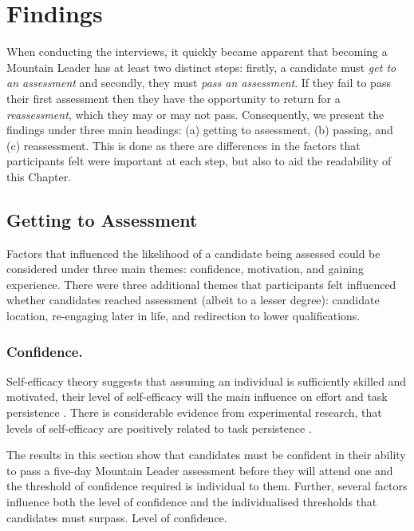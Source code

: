 \documentclass[
  12pt,
  a4paper,
]{book}
\begin{document}
\hypertarget{findings}{%
\section{Findings}\label{findings}}

When conducting the interviews, it quickly became apparent that becoming a Mountain Leader has at least two distinct steps: firstly, a candidate must \emph{get to an assessment} and secondly, they must \emph{pass an assessment}. If they fail to pass their first assessment then they have the opportunity to return for a \emph{reassessment}, which they may or may not pass. Consequently, we present the findings under three main headings: (a) getting to assessment, (b) passing, and (c) reassessment. This is done as there are differences in the factors that participants felt were important at each step, but also to aid the readability of this Chapter.

\hypertarget{qual-gta}{%
\subsection{Getting to Assessment}\label{qual-gta}}

Factors that influenced the likelihood of a candidate being assessed could be considered under three main themes: confidence, motivation, and gaining experience. There were three additional themes that participants felt influenced whether candidates reached assessment (albeit to a lesser degree): candidate location, re-engaging later in life, and redirection to lower qualifications.

\hypertarget{qual-gta-confidence}{%
\subsubsection{Confidence.}\label{qual-gta-confidence}}

Self-efficacy theory suggests that assuming an individual is sufficiently skilled and motivated, their level of self-efficacy will the main influence on effort and task persistence \citep{Bandura1977, Bandura2982, Bandura1997}. There is considerable evidence from experimental research, that levels of self-efficacy are positively related to task persistence \citep[e.g.,][]{Hutchinson2008, Tenenbaum2001, Weinberg1979, Weinberg1980, Weinberg1981}.

The results in this section show that candidates must be confident in their ability to pass a five-day Mountain Leader assessment before they will attend one and the threshold of confidence required is individual to them. Further, several factors influence both the level of confidence and the individualised thresholds that candidates must surpass. Level of confidence.
\end{document}

